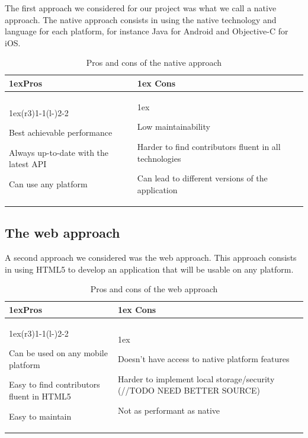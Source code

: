 \documentclass[11pt, a4paper]{report}
\begin{document}
The first approach we considered for our project was what we call a native approach. The native approach consists in using the native technology and language for each platform, for instance Java for Android and Objective-C for iOS.  

\begin{table}[H]
\begin{tabularx}{\linewidth}{>{\parskip1ex}X@{\kern4\tabcolsep}>{\parskip1ex}X}
\toprule
\hfil\bfseries Pros
&
\hfil\bfseries Cons
\\\cmidrule(r{3\tabcolsep}){1-1}\cmidrule(l{-\tabcolsep}){2-2}

Best achievable performance\par
Always up-to-date with the latest API\par
Can use any platform\par

&

Low maintainability\par
Harder to find contributors fluent in all technologies\par
Can lead to different versions of the application\par


\\\bottomrule
\end{tabularx}
\caption{Pros and cons of the native approach}
\end{table}

\subsection{The web approach}
A second approach we considered was the web approach. This approach consists in using HTML5 to develop an application that will be usable on any platform.


\begin{table}[H]
\begin{tabularx}{\linewidth}{>{\parskip1ex}X@{\kern4\tabcolsep}>{\parskip1ex}X}
\toprule
\hfil\bfseries Pros
&
\hfil\bfseries Cons
\\\cmidrule(r{3\tabcolsep}){1-1}\cmidrule(l{-\tabcolsep}){2-2}

Can be used on any mobile platform\par
Easy to find contributors fluent in HTML5\par
Easy to maintain\par

&

Doesn't have access to native platform features\par
Harder to implement local storage/security (//TODO NEED BETTER SOURCE)\par
Not as performant as native\par



\\\bottomrule
\end{tabularx}
\caption{Pros and cons of the web approach}
\end{table}
\end{document}
